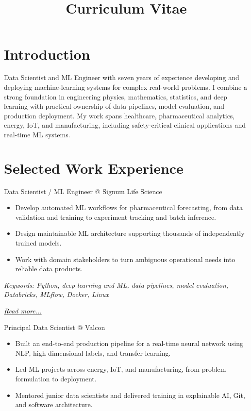 \documentclass[11pt,a4paper]{moderncv}
\title{Curriculum Vitae}
\begin{document}
\makecvtitle

\section*{Introduction}

Data Scientist and ML Engineer with seven years of experience developing and deploying machine-learning systems for complex real-world problems. I combine a strong foundation in engineering physics, mathematics, statistics, and deep learning with practical ownership of data pipelines, model evaluation, and production deployment. My work spans healthcare, pharmaceutical analytics, energy, IoT, and manufacturing, including safety-critical clinical applications and real-time ML systems.


\section{Selected Work Experience}

\large{Data Scientist / ML Engineer @ Signum Life Science}
\normalsize
\begin{itemize}
    \item Develop automated ML workflows for pharmaceutical forecasting, from data validation and training to experiment tracking and batch inference.
    \item Design maintainable ML architecture supporting thousands of independently trained models.
    \item Work with domain stakeholders to turn ambiguous operational needs into reliable data products.
\end{itemize}

{\footnotesize\textit{Keywords: Python, deep learning and ML, data pipelines, model evaluation, Databricks, MLflow, Docker, Linux}}

\hfill{\small{\textit{\hyperref[sec:signum]{Read more...}}}}

\large{Principal Data Scientist @ Valcon}
\normalsize
\begin{itemize}
    \item Built an end-to-end production pipeline for a real-time neural network using NLP, high-dimensional labels, and transfer learning.
    \item Led ML projects across energy, IoT, and manufacturing, from problem formulation to deployment.
    \item Mentored junior data scientists and delivered training in explainable AI, Git, and software architecture.
\end{itemize}
\end{document}
